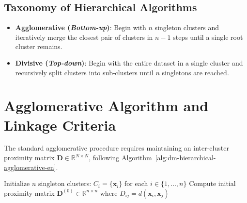 \subsection{Taxonomy of Hierarchical Algorithms}

\begin{itemize}
    \item \textbf{Agglomerative (\textit{Bottom-up})}: Begin with $n$ singleton clusters and iteratively merge the closest pair of clusters in $n - 1$ steps until a single root cluster remains.
    \item \textbf{Divisive (\textit{Top-down})}: Begin with the entire dataset in a single cluster and recursively split clusters into sub-clusters until $n$ singletons are reached.
\end{itemize}

\section{Agglomerative Algorithm and Linkage Criteria}
\label{sec:dm-agglomerative-linkage-criteria}

The standard agglomerative procedure requires maintaining an inter-cluster proximity matrix $\mathbf{D} \in \mathbb{R}^{N \times N}$, following Algorithm~\ref{alg:dm-hierarchical-agglomerative-en}.

\begin{algorithm}[htbp]
\SetAlgoLined
{}
Initialize $n$ singleton clusters: $C_i = \{\mathbf{x}_i\}$ for each $i \in \{1, \dots, n\}$\;
Compute initial proximity matrix $\mathbf{D}^{(0)} \in \mathbb{R}^{n \times n}$ where $D_{ij} = d(\mathbf{x}_i, \mathbf{x}_j)$\;
\caption{Standard agglomerative hierarchical clustering algorithm.}
\label{alg:dm-hierarchical-agglomerative-en}
\end{algorithm}

